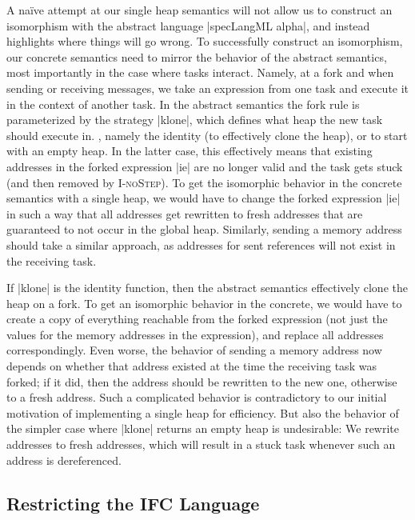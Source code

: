 A na\"ive attempt at our single heap semantics
will not allow us to construct an isomorphism
with the abstract language |specLangML alpha|, and instead highlights
where things will go wrong.
To successfully construct an isomorphism, our concrete semantics need
to mirror the behavior of the abstract semantics, most importantly
in the case where tasks interact.  Namely, at a fork and when sending
or receiving messages, we take an expression from one task and
execute it in the context of another task.  In the abstract semantics
the fork rule is parameterized by the strategy |klone|, which defines
what heap the new task should execute in.  , namely the identity (to effectively
clone the heap), or to start with an empty heap.
In the latter case, this effectively means that existing addresses
in the forked expression |ie| are no longer valid and the
task gets stuck (and then removed by \textsc{I-noStep}).
To get the isomorphic behavior in the concrete semantics with a
single heap, we would have to change the forked expression |ie| in
such a way that all addresses get rewritten to fresh addresses
that are guaranteed to not occur in the global heap.  Similarly,
sending a memory address should take a similar approach, as addresses
for sent references will not exist in the receiving task.

If |klone| is the identity function, then the abstract semantics
effectively clone the heap on a fork.  To get an isomorphic
behavior in the concrete, we would have to create a copy of everything
reachable from the forked expression (not just the values for
the memory addresses in the expression), and replace all addresses
correspondingly.  Even worse, the behavior of sending a memory address
now depends on whether that address existed at the time the receiving
task was forked;  if it did, then the address should be rewritten to the
new one, otherwise to a fresh address.
Such a complicated behavior is contradictory to our initial motivation
of implementing a single heap for efficiency.  But also the
behavior of the simpler case where |klone| returns an empty heap is
undesirable:  We rewrite addresses to fresh addresses, which will
result in a stuck task whenever such an address is dereferenced.

\subsection{Restricting the IFC Language}

